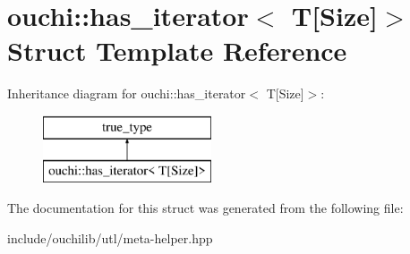 \hypertarget{structouchi_1_1has__iterator_3_01_t[_size]_4}{}\section{ouchi\+::has\+\_\+iterator$<$ T\mbox{[}Size\mbox{]}$>$ Struct Template Reference}
\label{structouchi_1_1has__iterator_3_01_t[_size]_4}
Inheritance diagram for ouchi\+::has\+\_\+iterator$<$ T\mbox{[}Size\mbox{]}$>$\+:\begin{figure}[H]
\begin{center}
\leavevmode
\includegraphics[height=2.000000cm]{structouchi_1_1has__iterator_3_01_t[_size]_4}
\end{center}
\end{figure}


The documentation for this struct was generated from the following file\+:\begin{DoxyCompactItemize}
\item 
include/ouchilib/utl/meta-\/helper.\+hpp\end{DoxyCompactItemize}
